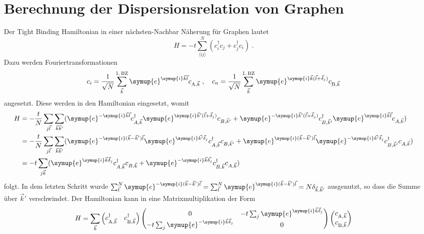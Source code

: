 \section{Berechnung der Dispersionsrelation von Graphen}
\label{sec:calc_dispersion}
Der Tight Binding Hamiltonian in einer nächsten-Nachbar Näherung für Graphen lautet
\begin{equation*}
   H= - t \sum_{\langle ij \rangle }^N \left ( c_i^\dagger c_j + c_j^\dagger c_i \right ) \; .
\end{equation*}
Dazu werden Fouriertransformationen 
\begin{equation*}
    c_i = \frac{1}{\sqrt{N}} \sum_{\vec{k}}^{1. \, \text{BZ}} \symup{e}^{\symup{i}\vec{k}\vec{l}} c_{\text{A}, \vec{k}} \; , 
    \quad c_n = \frac{1}{\sqrt{N}} \sum_{\vec{k}}^{1. \, \text{BZ}} \symup{e}^{\symup{i}\vec{k}(\vec{l}+\vec{\delta}_j)} c_{\text{B}, \vec{k}}
\end{equation*}
angesetzt. 
Diese werden in den Hamiltonian eingesetzt, womit 
\begin{align*}
    H &= -\frac{t}{N} \sum_{j\vec{l}} \sum_{\vec{k}\vec{k}'} ( \symup{e}^{-\symup{i}\vec{k}\vec{l}}c^\dagger_{A,\vec{k}} 
    \symup{e}^{\symup{i}\vec{k}'(\vec{l}+\vec{\delta}_j)}c_{B,\vec{k}'} + \symup{e}^{-\symup{i}\vec{k}'(\vec{l}+\vec{\delta}_j)} c^\dagger_{B,\vec{k}'} 
    \symup{e}^{\symup{i}\vec{k}\vec{l}}c_{A,\vec{k}}) \\
    &= -\frac{t}{N} \sum_{j\vec{l}} \sum_{\vec{k}\vec{k}'} ( \symup{e}^{-\symup{i}(\vec{k}- \vec{k}')\vec{l}}\symup{e}^{\symup{i}\vec{k'}\vec{\delta}_j}c^\dagger_{A,\vec{k}} c_{B,\vec{k}'} + 
    \symup{e}^{\symup{i}(\vec{k}- \vec{k}')\vec{l}} \symup{e}^{-\symup{i}\vec{k'}\vec{\delta}_j} c^\dagger_{B,\vec{k}'}c_{A,\vec{k}}) \\
    &= -t \sum_{j\vec{k}} ( \symup{e}^{\symup{i}\vec{k}\vec{\delta}_j}c^\dagger_{A,\vec{k}} c_{B,\vec{k}} + 
    \symup{e}^{-\symup{i}\vec{k}\vec{\delta_j}} c^\dagger_{B,\vec{k}}c_{A,\vec{k}})
\end{align*}
folgt.
In dem letzten Schritt wurde $\sum_{\vec{l}}^N \symup{e}^{-\symup{i}(\vec{k}- \vec{k}')\vec{l}} 
= \sum_{\vec{l}}^N \symup{e}^{\symup{i}(\vec{k}- \vec{k}')\vec{l}} = N\delta_{\vec{k}, \vec{k}'}$ ausgenutzt, so dass die Summe über $\vec{k}'$ verschwindet.
Der Hamiltonian kann in eine Matrixmultiplikation der Form 
\begin{equation*}
    H = \sum_{\vec{k}} \begin{pmatrix}
        c_{\text{A},\vec{k}}^{\dagger} & c_{\text{B},\vec{k}}^{\dagger}
    \end{pmatrix}
    \begin{pmatrix}
        0 & -t\sum_{j} \symup{e}^{\symup{i}\vec{k}\vec{\delta}_j}     \\
        -t\sum_{j} \symup{e}^{-\symup{i}\vec{k}\vec{\delta}_j} & 0     
    \end{pmatrix}
    \begin{pmatrix}
        c_{\text{A},\vec{k}} \\
        c_{\text{B},\vec{k}}
    \end{pmatrix}
\end{equation*}
